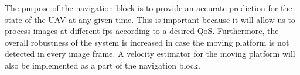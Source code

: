 \documentclass[conference, onecolumn, draftclsnofoot]{IEEEtran}
\begin{document}
The purpose of the navigation block is to provide an accurate
prediction for the state of the UAV at any given time. This is
important because it will allow us to process images at different fps
according to a desired QoS. Furthermore, the overall robustness of the
system is increased in case the moving platform is not detected in
every image frame. A velocity estimator for the moving platform will
also be implemented as a part of the navigation block.


\end{document}
